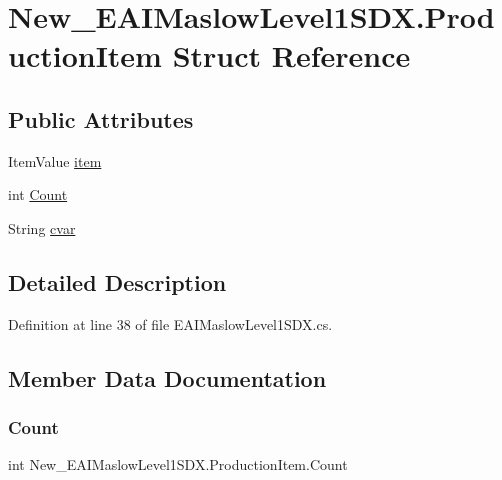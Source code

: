 \hypertarget{struct_new___e_a_i_maslow_level1_s_d_x_1_1_production_item}{}\section{New\+\_\+\+E\+A\+I\+Maslow\+Level1\+S\+D\+X.\+Production\+Item Struct Reference}
\label{struct_new___e_a_i_maslow_level1_s_d_x_1_1_production_item}
\subsection*{Public Attributes}
\begin{DoxyCompactItemize}
\item 
Item\+Value \mbox{\hyperlink{struct_new___e_a_i_maslow_level1_s_d_x_1_1_production_item_ab1a604a6c64a3b514e144a9da04234c3}{item}}
\item 
int \mbox{\hyperlink{struct_new___e_a_i_maslow_level1_s_d_x_1_1_production_item_a751a05465fb213a9e3a3455f969fef75}{Count}}
\item 
String \mbox{\hyperlink{struct_new___e_a_i_maslow_level1_s_d_x_1_1_production_item_abe400ee4841645288f8262717d7aa955}{cvar}}
\end{DoxyCompactItemize}


\subsection{Detailed Description}


Definition at line 38 of file E\+A\+I\+Maslow\+Level1\+S\+D\+X.\+cs.



\subsection{Member Data Documentation}
\mbox{\label{struct_new___e_a_i_maslow_level1_s_d_x_1_1_production_item_a751a05465fb213a9e3a3455f969fef75}} 
\subsubsection{\texorpdfstring{Count}{Count}}
{\footnotesize\ttfamily int New\+\_\+\+E\+A\+I\+Maslow\+Level1\+S\+D\+X.\+Production\+Item.\+Count}



